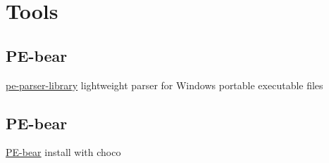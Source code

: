 \section{Tools}

\subsection{PE-bear}

\href{https://github.com/trailofbits/pe-parse}{pe-parser-library} lightweight parser for Windows portable executable files

\subsection{PE-bear}

\href{https://github.com/hasherezade/pe-bear}{PE-bear} install with choco